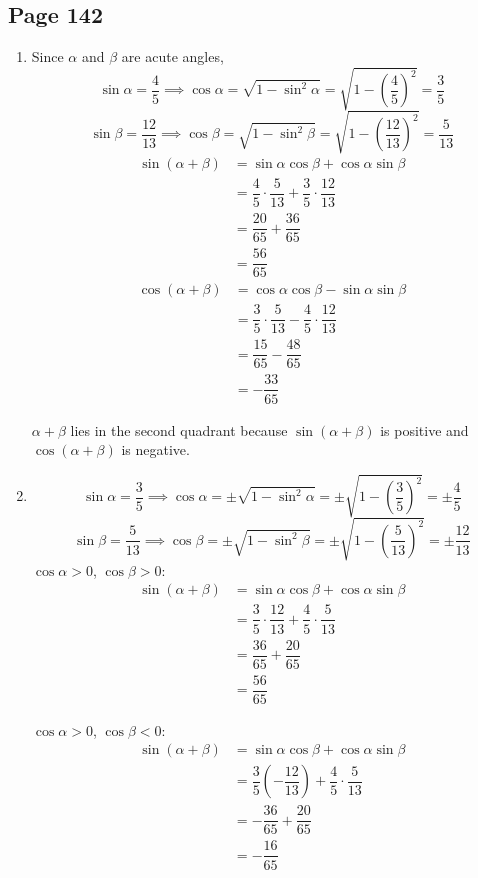 \documentclass{article}
\newenvironment{solutions}[1]
{\subsection*{#1}
 \begin{enumerate}[leftmargin=1.5em]}
{\end{enumerate}}
\newcommand{\solution}{\item}
\begin{document}
\begin{solutions}{Page 142}
\solution %
Since $\alpha$ and $\beta$ are acute angles,
\[
\sin{\alpha} = \dfrac{4}{5} \implies \cos{\alpha} = \sqrt{1-\sin^{2}{\alpha}} = \sqrt{1-\left(\dfrac{4}{5}\right)^2} = \dfrac{3}{5}
\]
\[
\sin{\beta} = \dfrac{12}{13} \implies \cos{\beta} = \sqrt{1-\sin^{2}{\beta}} = \sqrt{1-\left(\dfrac{12}{13}\right)^2} = \dfrac{5}{13}
\]
\begin{align*}
\sin\left(\alpha+\beta\right) &= \sin{\alpha}\cos{\beta} + \cos{\alpha}\sin{\beta} \\
&= \dfrac{4}{5} \cdot \dfrac{5}{13} + \dfrac{3}{5} \cdot \dfrac{12}{13} \\
&= \dfrac{20}{65} + \dfrac{36}{65} \\
&= \dfrac{56}{65}
\end{align*}
\begin{align*}
\cos\left(\alpha+\beta\right) &= \cos{\alpha}\cos{\beta} - \sin{\alpha}\sin{\beta} \\
&= \dfrac{3}{5} \cdot \dfrac{5}{13} - \dfrac{4}{5} \cdot \dfrac{12}{13} \\
&= \dfrac{15}{65} - \dfrac{48}{65} \\
&= -\dfrac{33}{65}
\end{align*}

$\alpha+\beta$ lies in the second quadrant because $\sin\left(\alpha+\beta\right)$ is positive and $\cos\left(\alpha+\beta\right)$ is negative.

\solution %
\[
\sin{\alpha} = \dfrac{3}{5} \implies \cos{\alpha} = \pm \sqrt{1-\sin^{2}{\alpha}} = \pm \sqrt{1-\left(\dfrac{3}{5}\right)^2} = \pm \dfrac{4}{5}
\]
\[
\sin{\beta} = \dfrac{5}{13} \implies \cos{\beta} = \pm \sqrt{1-\sin^{2}{\beta}} = \pm \sqrt{1-\left(\dfrac{5}{13}\right)^2} = \pm \dfrac{12}{13}
\]
$\cos{\alpha} > 0$, $\cos{\beta} > 0$:
\begin{align*}
\sin\left(\alpha+\beta\right) &= \sin{\alpha}\cos{\beta} + \cos{\alpha}\sin{\beta} \\
&= \dfrac{3}{5} \cdot \dfrac{12}{13} + \dfrac{4}{5} \cdot \dfrac{5}{13} \\
&= \dfrac{36}{65} + \dfrac{20}{65} \\
&= \dfrac{56}{65}
\end{align*}

$\cos{\alpha} > 0$, $\cos{\beta} < 0$:
\begin{align*}
\sin\left(\alpha+\beta\right) &= \sin{\alpha}\cos{\beta} + \cos{\alpha}\sin{\beta} \\
&= \dfrac{3}{5} \left(-\dfrac{12}{13}\right) + \dfrac{4}{5} \cdot \dfrac{5}{13} \\
&= -\dfrac{36}{65} + \dfrac{20}{65} \\
&= -\dfrac{16}{65}
\end{align*}


\end{solutions}
\end{document}
